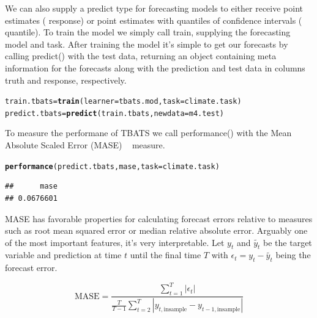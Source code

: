 \documentclass[12pt]{article}\usepackage[]{graphicx}\usepackage[]{color}
\makeatletter
\newcommand{\hlstd}[1]{\textcolor[rgb]{0.345,0.345,0.345}{#1}}%
\newcommand{\hlkwb}[1]{\textcolor[rgb]{0.69,0.353,0.396}{#1}}%
\newcommand{\hlkwc}[1]{\textcolor[rgb]{0.333,0.667,0.333}{#1}}%
\newcommand{\hlkwd}[1]{\textcolor[rgb]{0.737,0.353,0.396}{\textbf{#1}}}%
\newenvironment{kframe}{%
 \def\at@end@of@kframe{}%
 \ifinner\ifhmode%
  \def\at@end@of@kframe{\end{minipage}}%
  \begin{minipage}{\columnwidth}%
 \fi\fi%
 \def\FrameCommand##1{\hskip\@totalleftmargin \hskip-\fboxsep
 \colorbox{shadecolor}{##1}\hskip-\fboxsep
     \hskip-\linewidth \hskip-\@totalleftmargin \hskip\columnwidth}%
 \MakeFramed {\advance\hsize-\width
   \@totalleftmargin\z@ \linewidth\hsize
   \@setminipage}}%
 {\par\unskip\endMakeFramed%
 \at@end@of@kframe}
\newenvironment{knitrout}{}{} %
\theoremstyle{definition}
\newcommand\code{\@codex}
\def\@codex#1{{\normalfont\ttfamily\hyphenchar\font=-1 #1}}
\makeatother
\begin{document}
We can also supply a predict type for forecasting models to either receive point estimates (\code{response}) or point estimates with quantiles of confidence intervals (\code{quantile}). To train the model we simply call train, supplying the forecasting model and task. After training the model it's simple to get our forecasts by calling \code{predict()} with the test data, returning an object containing meta information for the forecasts along with the prediction and test data in columns \code{truth} and \code{response}, respectively.

\singlespacing
\begin{knitrout}
\color{fgcolor}\begin{kframe}
\begin{alltt}
\hlstd{train.tbats}\hlkwb{=} \hlkwd{train}\hlstd{(}\hlkwc{learner} \hlstd{= tbats.mod,} \hlkwc{task} \hlstd{= climate.task )}
\hlstd{predict.tbats} \hlkwb{=} \hlkwd{predict}\hlstd{(train.tbats,} \hlkwc{newdata} \hlstd{= m4.test)}
\end{alltt}
\end{kframe}
\end{knitrout}
\doublespacing

To measure the performane of TBATS we call \code{performance()} with the Mean Absolute Scaled Error (MASE) ~\cite{Hyndman2006} measure.

\singlespacing
\begin{knitrout}
\color{fgcolor}\begin{kframe}
\begin{alltt}
\hlkwd{performance}\hlstd{(predict.tbats, mase,} \hlkwc{task} \hlstd{= climate.task)}
\end{alltt}
\begin{verbatim}
##      mase 
## 0.0676601
\end{verbatim}
\end{kframe}
\end{knitrout}
\doublespacing
MASE has favorable properties for calculating forecast errors relative to measures such as root mean squared error or median relative absolute error. Arguably one of the most important features, it's very interpretable. Let $y_t$ and $\tilde{y_t}$ be the target variable and prediction at time $t$ until the final time $T$ with $\epsilon_t = y_t - \tilde{y_t}$ being the forecast error. 

\begin{equation}
\text{MASE} = \frac{\sum_{t=1}^T |\epsilon_t|}{\frac{T}{T-1} \sum_{t=2}^T |y_{t, \text{insample}} - y_{t-1, \text{insample}}|}
\end{equation}
\end{document}
